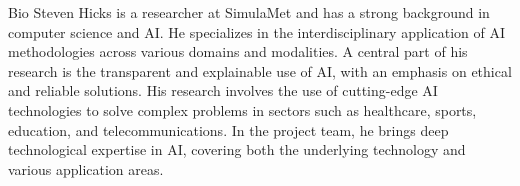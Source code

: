\begin{rubric}{Bio}
\entry*[] Steven Hicks is a researcher at SimulaMet and has a strong background in computer science and AI. He specializes in the interdisciplinary application of AI methodologies across various domains and modalities. A central part of his research is the transparent and explainable use of AI, with an emphasis on ethical and reliable solutions. His research involves the use of cutting-edge AI technologies to solve complex problems in sectors such as healthcare, sports, education, and telecommunications. In the project team, he brings deep technological expertise in AI, covering both the underlying technology and various application areas.
\end{rubric}
